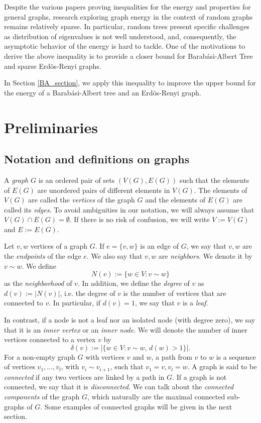 \documentclass[a4paper]{article}
\newcommand{\abs}[1]{\left\lvert#1\right\rvert}
\theoremstyle{plain}
\begin{document}
Despite the various papers proving inequalities for the energy and properties for general graphs,  research exploring graph energy in the context of random graphs remains relatively sparse. In particular, random trees present specific challenges as distribution of eigenvalues is not well understood, and, consequently, the asymptotic behavior of the energy is hard to tackle. One of the motivations to derive the above inequality is to provide a closer bound for Barab\'asi-Albert Tree and  sparse Erd\"os-Renyi graphs.

In Section \ref{BA_section}, we apply this inequality to improve the upper bound for the energy of a Barab\'asi-Albert tree and an Erd\"os-Renyi graph.

\section{Preliminaries}

\subsection{Notation and definitions on graphs}

A \textit{graph} \(G\) is an ordered pair of sets \((V(G),E(G))\) such that the elements of \(E(G)\) are unordered pairs of different elements in \(V(G)\). The elements of \(V(G)\) are called the \textit{vertices} of the graph \(G\) and the elements of \(E(G)\) are called its \textit{edges}. To avoid ambiguities in our notation, we will always assume that \(V(G) \cap E(G) = \emptyset\). If there is no risk of confusion, we will write \(V := V(G)\) and \(E := E(G)\).

Let \(v,w\) vertices of a graph \(G\). If \(e = \{v,w\}\) is an edge of \(G\), we say that \(v,w\) are the \textit{endpoints} of the edge \(e\). We also say that \(v,w\) are \textit{neighbors}.%
We denote it by \(v \sim w\). We define
\[
    N(v) := \{w \in V : v \sim w\}
\]
as the \textit{neighborhood} of \(v\). In addition, we define the \textit{degree} of \(v\) as \(d(v) := \abs{N(v)}\), i.e. the degree of \(v\) is the number of vertices that are connected to \(v\). In particular, if \(d(v) = 1\), we say that \(v\) is a \textit{leaf}.

In contrast, if a node is not a leaf nor an isolated node (with degree zero), we say that it is an \textit{inner vertex} or an \textit{inner node}. We will denote the number of inner vertices connected to a vertex \(v\) by
\[
    \delta(v) := \abs{\{w \in V : v \sim w, \, d(w) > 1\}}.
\]
For a non-empty graph \(G\) with vertices $v$ and $w$, a path from $v$ to $w$ is a sequence of vertices $v_1,\dots,v_l$, with $v_i\sim v_{i+1}$, such that  $v_1=v,v_l=w$. A graph is said to be \textit{connected} if any two vertices are linked by a path in \(G\).  If a graph is not connected, we say that it is \textit{disconnected}. We can talk about the \textit{connected components} of the graph \(G\), which naturally are the maximal connected sub-graphs of \(G\). Some examples of connected graphs will be given in the next section.
\end{document}

